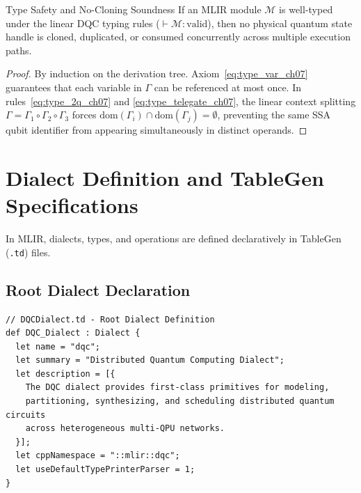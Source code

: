 \begin{theorembox}{Type Safety and No-Cloning Soundness}
If an MLIR module $\mathcal{M}$ is well-typed under the linear DQC typing rules ($\vdash \mathcal{M} : \text{valid}$), then no physical quantum state handle is cloned, duplicated, or consumed concurrently across multiple execution paths.
\end{theorembox}

\begin{proof}
By induction on the derivation tree. Axiom~\eqref{eq:type_var_ch07} guarantees that each variable in $\Gamma$ can be referenced at most once. In rules~\eqref{eq:type_2q_ch07} and \eqref{eq:type_telegate_ch07}, the linear context splitting $\Gamma = \Gamma_1 \circ \Gamma_2 \circ \Gamma_3$ forces $\text{dom}(\Gamma_i) \cap \text{dom}(\Gamma_j) = \emptyset$, preventing the same SSA qubit identifier from appearing simultaneously in distinct operands.
\end{proof}

\section{Dialect Definition and TableGen Specifications}
\label{sec:tablegen_spec}

In MLIR, dialects, types, and operations are defined declaratively in TableGen (\texttt{.td}) files.

\subsection{Root Dialect Declaration}
\begin{lstlisting}[language=MLIR, caption={TableGen root definition of the DQC Dialect (DQCDialect.td)}]
// DQCDialect.td - Root Dialect Definition
def DQC_Dialect : Dialect {
  let name = "dqc";
  let summary = "Distributed Quantum Computing Dialect";
  let description = [{
    The DQC dialect provides first-class primitives for modeling, 
    partitioning, synthesizing, and scheduling distributed quantum circuits 
    across heterogeneous multi-QPU networks.
  }];
  let cppNamespace = "::mlir::dqc";
  let useDefaultTypePrinterParser = 1;
}
\end{lstlisting}

